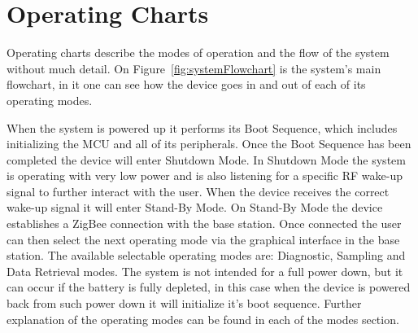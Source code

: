 \section{Operating Charts}
Operating charts describe the modes of operation and the flow of the system without much detail. On Figure~\ref{fig:systemFlowchart} is the system's main flowchart, in it one can see how the device goes in and out of each of its operating modes. 

When the system is powered up it performs its Boot Sequence, which includes initializing the MCU and all of its peripherals. Once the Boot Sequence has been completed the device will enter Shutdown Mode. In Shutdown Mode the system is operating with very low power and is also listening for a specific RF wake-up signal to further interact with the user. When the device receives the correct wake-up signal it will enter Stand-By Mode. On Stand-By Mode the device establishes a ZigBee connection with the base station. Once connected the user can then select the next operating mode via the graphical interface in the base station. The available selectable operating modes are: Diagnostic, Sampling and Data Retrieval modes. The system is not intended for a full power down, but it can occur if the battery is fully depleted, in this case when the device is powered back from such power down it will initialize it's boot sequence. Further explanation of the operating modes can be found in each of the modes section.
